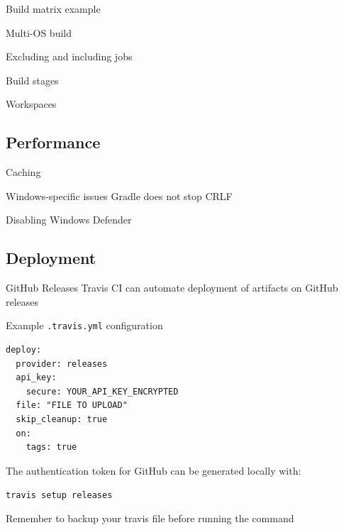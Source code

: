 \documentclass[presentation]{beamer}
\begin{document}
\begin{frame}{Build matrix example}
\end{frame}

\begin{frame}{Multi-OS build}
\end{frame}

\begin{frame}{Excluding and including jobs}
\end{frame}

\begin{frame}{Build stages}
\end{frame}

\begin{frame}{Workspaces}
\end{frame}

\subsection{Performance}

\begin{frame}{Caching}
\end{frame}

\begin{frame}{Windows-specific issues}
    Gradle does not stop
    CRLF
\end{frame}

\begin{frame}{Disabling Windows Defender}
\end{frame}

\subsection{Deployment}

\begin{frame}[fragile]{GitHub Releases}
    Travis CI can automate deployment of artifacts on GitHub releases
    \begin{block}{Example \texttt{.travis.yml} configuration}
        \begin{verbatim}
deploy:
  provider: releases
  api_key:
    secure: YOUR_API_KEY_ENCRYPTED
  file: "FILE TO UPLOAD"
  skip_cleanup: true
  on:
    tags: true
        \end{verbatim}
    \end{block}
    The authentication token for GitHub can be generated locally with:
    
    \texttt{travis setup releases}
    
    Remember to backup your travis file before running the command
\end{frame}
\end{document}
